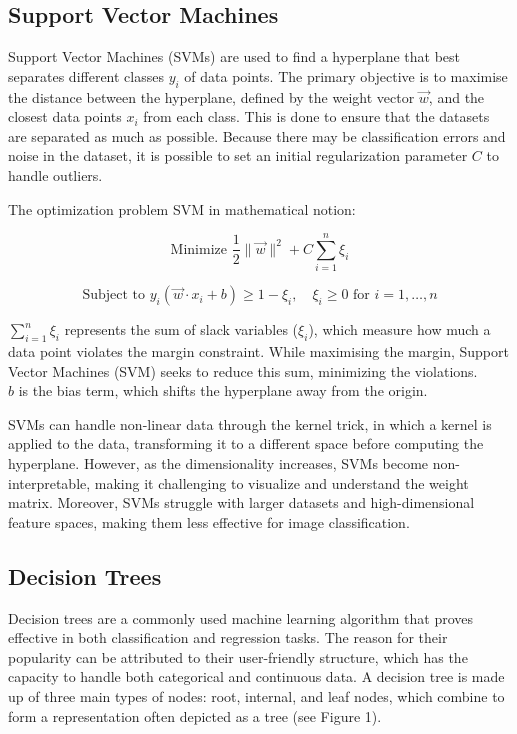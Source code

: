 \subsection{Support Vector Machines}

Support Vector Machines (SVMs) \cite{boser1992training} are used to find a hyperplane that best separates different classes $y_i$ of data points. The primary objective is to maximise the distance between the hyperplane, defined by the weight vector $\vec{w}$, and the closest data points $x_i$ from each class. This is done to ensure that the   datasets are separated as much as possible. Because there may be classification errors and noise in the   dataset, it is possible to set an initial regularization parameter $C$ to handle outliers.

The optimization problem SVM in mathematical notion:

$$\text{Minimize } \frac{1}{2} \|\vec{w}\|^2 + C \sum_{i=1}^{n} \xi_i$$

$$\text{Subject to } y_i (\vec{w} \cdot x_i + b) \geq 1 - \xi_i, \quad \xi_i \geq 0 \text{ for } i = 1, \ldots, n$$

$\sum_{i=1}^{n} \xi_i$ represents the sum of slack variables ($\xi_i$), which measure how much a data point violates the margin constraint. While maximising the margin, Support Vector Machines (SVM) seeks to reduce this sum, minimizing the violations.\\
$ b $ is the bias term, which shifts the hyperplane away from the origin.

SVMs can handle non-linear data through the kernel trick, in which a kernel is applied to the data, transforming it to a different space before computing the hyperplane. However, as the dimensionality increases, SVMs become non-interpretable, making it challenging to visualize and understand the weight matrix. Moreover, SVMs struggle with larger datasets and high-dimensional feature spaces, making them less effective for image classification.


\subsection{Decision Trees}
\label{decision_tree}


Decision trees are a commonly used machine learning algorithm that proves effective in both classification and regression tasks. The reason for their popularity can be attributed to their user-friendly structure, which has the capacity to handle both categorical and continuous data. A decision tree is made up of three main types of nodes: root, internal, and leaf nodes, which combine to form a representation often depicted as a tree (see Figure 1).

